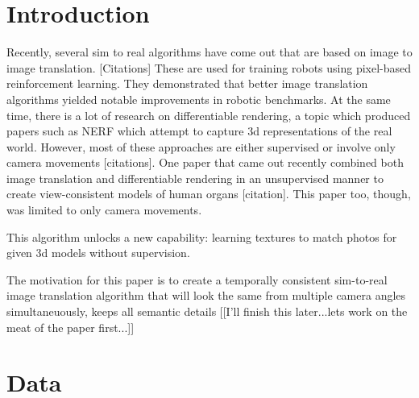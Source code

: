 \documentclass{article}
\begin{document}

\section{Introduction}
	

Recently, several sim to real algorithms have come out that are based on image to image translation. [Citations]
These are used for training robots using pixel-based reinforcement learning.
They demonstrated that better image translation algorithms yielded notable improvements in robotic benchmarks.
At the same time, there is a lot of research on differentiable rendering,
a topic which produced papers such as NERF which attempt to capture 3d representations of the real world.
However, most of these approaches are either supervised or involve only camera movements [citations].
One paper that came out recently combined both image translation and differentiable rendering in an unsupervised manner to create view-consistent models of human organs [citation].
This paper too, though, was limited to only camera movements.

This algorithm unlocks a new capability: learning textures to match photos for given 3d models without supervision.

The motivation for this paper is to create a temporally consistent sim-to-real image translation algorithm that will look the same from multiple camera angles simultaneuously, keeps all semantic details 
[[I'll finish this later...lets work on the meat of the paper first...]]

		



\section{Data}
\label{sec:data}
\end{document}
